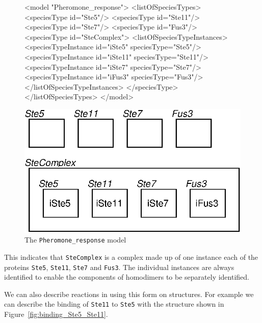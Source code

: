 \documentclass{cekarticle}
\begin{document}
\begin{figure}[h]
\begin{example}
<model "Pheromone_response">
    <listOfSpeciesTypes>
        <speciesType id="Ste5"/>
        <speciesType id="Ste11"/>
        <speciesType id="Ste7"/>
        <speciesType id="Fus3"/>
        <speciesType id="SteComplex">
            <listOfSpeciesTypeInstances>
                <speciesTypeInstance id="iSte5" speciesType="Ste5"/>
                <speciesTypeInstance id="iSte11" speciesType="Ste11"/>
                <speciesTypeInstance id="iSte7" speciesType="Ste7"/>
                <speciesTypeInstance id="iFus3" speciesType="Fus3"/>
            </listOfSpeciesTypeInstances>
        </speciesType>
    </listOfSpeciesTypes>
</model>
\end{example}
  \vspace*{8pt}
  \centering
  \includegraphics[scale = 0.7]{pheromone_response.eps}
  \caption{The \texttt{Pheromone\_response} model}
  \label{fig:pheromone_response}
\end{figure}

This indicates that \texttt{SteComplex}
is a complex made up of one instance each of the proteins \texttt{Ste5}, \texttt{Ste11}, \texttt{Ste7}
and \texttt{Fus3}.  The individual instances are always identified to enable the components of homodimers
to be separately identified.

We can also describe reactions in using this form on  structures.  For example
we can describe the binding of \texttt{Ste11} to \texttt{Ste5} with the 
structure shown in Figure~\ref{fig:binding_Ste5_Ste11}.
\end{document}

